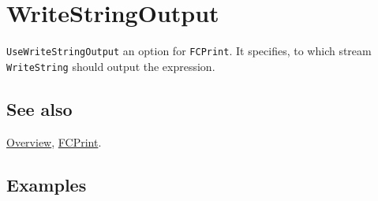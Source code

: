 \documentclass[../FeynCalcManual.tex]{subfiles}
\begin{document}
\hypertarget{writestringoutput}{
\section{WriteStringOutput}\label{writestringoutput}}

\texttt{UseWriteStringOutput} an option for \texttt{FCPrint}. It
specifies, to which stream \texttt{WriteString} should output the
expression.

\subsection{See also}

\hyperlink{toc}{Overview}, \hyperlink{fcprint}{FCPrint}.

\subsection{Examples}
\end{document}
